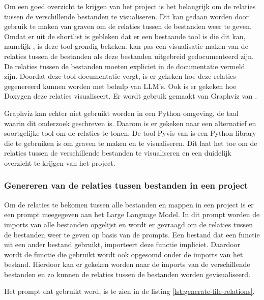 Om een goed overzicht te krijgen van het project is het belangrijk om de relaties tussen de verschillende bestanden te visualiseren.
Dit kan gedaan worden door gebruik te maken van graven om de relaties tussen de bestanden weer te geven.
Omdat er uit de shortlist is gebleken dat er een bestaande tool is die dit kan, namelijk \textcite{Doxygen2023}, is deze tool grondig bekeken.
\textcite{Doxygen2023} kan pas een visualisatie maken van de relaties tussen de bestanden als deze bestanden uitgebreid gedocumenteerd zijn. 
De relaties tussen de bestanden moeten expliciet in de documentatie vermeld zijn.
Doordat deze tool documentatie vergt, is er gekeken hoe deze relaties gegenereerd kunnen worden met behulp van LLM's.
Ook is er gekeken hoe Doxygen deze relaties visualiseert. Er wordt gebruik gemaakt van Graphviz van \textcite{GraphvizAuthors2024}.

Graphviz \autocite{GraphvizAuthors2024} kan echter niet gebruikt worden in een Python omgeving, de taal waarin dit onderzoek geschreven is.
Daarom is er gekeken naar een alternatief en soortgelijke tool om de relaties te tonen.
De tool Pyvis van \textcite{WHIR2018} is een Python library die te gebruiken is om graven te maken en te visualiseren.
Dit laat het toe om de relaties tussen de verschillende bestanden te visualiseren en een duidelijk overzicht te krijgen van het project.

\subsubsection{Genereren van de relaties tussen bestanden in een project}
\label{subsec:project-documentatie-relaties-genereren}

Om de relaties te bekomen tussen alle bestanden en mappen in een project is er een prompt meegegeven aan het Large Language Model.
In dit prompt worden de imports van alle bestanden opgelijst en wordt er gevraagd om de relaties tussen de bestanden weer te geven op basis van de prompts.
Een bestand dat een functie uit een ander bestand gebruikt, importeert deze functie impliciet. 
Daardoor wordt de functie die gebruikt wordt ook opgesomd onder de imports van het bestand.
Hierdoor kan er gekeken worden naar de imports van de verschillende bestanden en zo kunnen de relaties tussen de bestanden worden gevisualiseerd.

Het prompt dat gebruikt werd, is te zien in de listing \ref{lst:generate-file-relations}.

